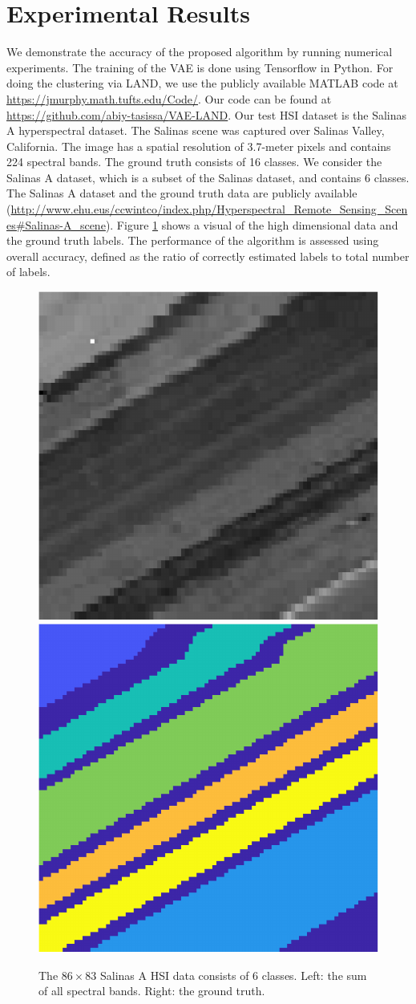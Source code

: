 \documentclass{article}
\begin{document}
\section{Experimental Results}
\label{sec:Experiments}
We demonstrate the accuracy of the proposed algorithm by running numerical experiments. The training of the VAE is done using Tensorflow in Python. For doing the clustering via LAND, we use the publicly available MATLAB code 
at  \url{https://jmurphy.math.tufts.edu/Code/}. Our code can be found at \url{https://github.com/abiy-tasissa/VAE-LAND}. Our test HSI dataset is the Salinas A hyperspectral dataset. The Salinas scene was captured over Salinas Valley, California. The image has a spatial resolution of 3.7-meter pixels and contains 224 spectral bands. The ground truth consists of 16 classes. We consider the Salinas A dataset, which is a subset of the Salinas dataset, and contains 6 classes. The Salinas A dataset and the ground truth data are publicly available (\url{http://www.ehu.eus/ccwintco/index.php/Hyperspectral_Remote_Sensing_Scenes#Salinas-A_scene}). Figure \ref{fig:SalinasA} shows a visual of the high dimensional data and the ground truth labels. The performance of the algorithm is assessed using overall accuracy, defined as the ratio of correctly estimated labels to total number of labels. 

\begin{figure}[htb]
\includegraphics[width=.23\textwidth,clip]{Images/SalinasA_BandSum-crop.pdf}
\includegraphics[width=.23\textwidth,clip]{Images/SalinasA_GT-crop.pdf}
\caption{\small{The $86\times 83$ Salinas A HSI data consists of 6 classes.  Left: the sum of all spectral bands.  Right: the ground truth.}}
\label{fig:SalinasA}
\end{figure}
\end{document}
